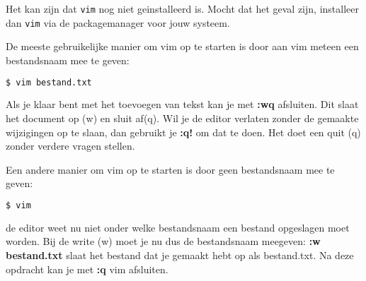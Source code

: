 Het kan zijn dat \texttt{vim} nog niet geinstalleerd is. Mocht dat het geval zijn, installeer dan \texttt{vim} via de packagemanager voor jouw systeem. 

De meeste gebruikelijke manier om vim op te starten is door aan vim meteen een bestandsnaam mee te geven:
\begin{lstlisting}[language=bash]
$ vim bestand.txt
\end{lstlisting}
Als je klaar bent met het toevoegen van tekst kan je met \textbf{:wq} afsluiten. Dit slaat het document op (w) en sluit af(q). Wil je de editor verlaten zonder de gemaakte wijzigingen op te slaan, dan gebruikt je \textbf{:q!} om dat te doen. Het doet een quit (q) zonder verdere vragen stellen.

Een andere manier om vim op te starten is door geen bestandsnaam mee te geven:
\begin{lstlisting}[language=bash]
$ vim
\end{lstlisting}
de editor weet nu niet onder welke bestandsnaam een bestand opgeslagen moet worden. Bij de write (w) moet je nu dus de bestandsnaam meegeven: \textbf{:w bestand.txt} slaat het bestand dat je gemaakt hebt op als bestand.txt. Na deze opdracht kan je met \textbf{:q} vim afsluiten.
